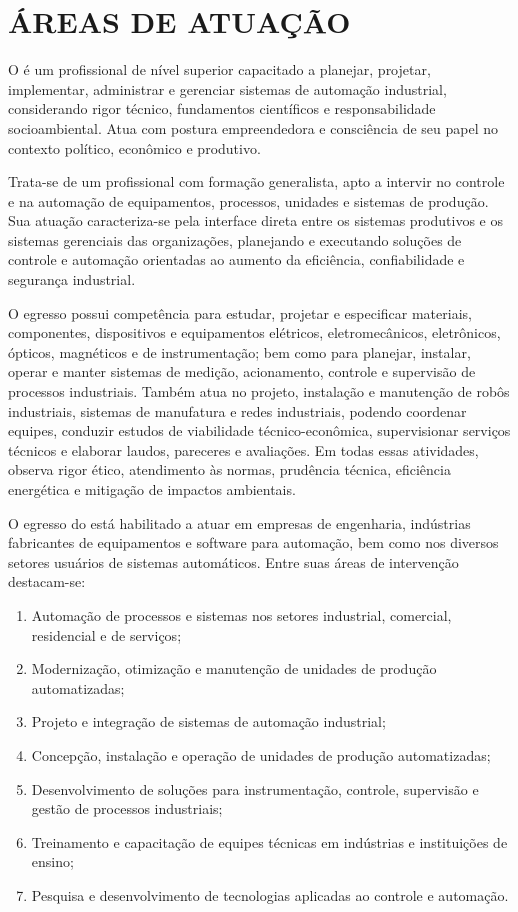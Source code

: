\section{ÁREAS DE ATUAÇÃO}

O \NOMEEGRESSO é um profissional de nível superior capacitado a planejar, projetar, implementar, administrar e gerenciar sistemas de automação industrial, considerando rigor técnico, fundamentos científicos e responsabilidade socioambiental. Atua com postura empreendedora e consciência de seu papel no contexto político, econômico e produtivo.

Trata-se de um profissional com formação generalista, apto a intervir no controle e na automação de equipamentos, processos, unidades e sistemas de produção. Sua atuação caracteriza-se pela interface direta entre os sistemas produtivos e os sistemas gerenciais das organizações, planejando e executando soluções de controle e automação orientadas ao aumento da eficiência, confiabilidade e segurança industrial.

O egresso possui competência para estudar, projetar e especificar materiais, componentes, dispositivos e equipamentos elétricos, eletromecânicos, eletrônicos, ópticos, magnéticos e de instrumentação; bem como para planejar, instalar, operar e manter sistemas de medição, acionamento, controle e supervisão de processos industriais. Também atua no projeto, instalação e manutenção de robôs industriais, sistemas de manufatura e redes industriais, podendo coordenar equipes, conduzir estudos de viabilidade técnico-econômica, supervisionar serviços técnicos e elaborar laudos, pareceres e avaliações. Em todas essas atividades, observa rigor ético, atendimento às normas, prudência técnica, eficiência energética e mitigação de impactos ambientais.

O egresso do \NOMECURSO está habilitado a atuar em empresas de engenharia, indústrias fabricantes de equipamentos e software para automação, bem como nos diversos setores usuários de sistemas automáticos. Entre suas áreas de intervenção destacam-se:

\begin{enumerate}
	\item Automação de processos e sistemas nos setores industrial, comercial, residencial e de serviços;
	\item Modernização, otimização e manutenção de unidades de produção automatizadas;
	\item Projeto e integração de sistemas de automação industrial;
	\item Concepção, instalação e operação de unidades de produção automatizadas;
	\item Desenvolvimento de soluções para instrumentação, controle, supervisão e gestão de processos industriais;
	\item Treinamento e capacitação de equipes técnicas em indústrias e instituições de ensino;
	\item Pesquisa e desenvolvimento de tecnologias aplicadas ao controle e automação.
\end{enumerate}

